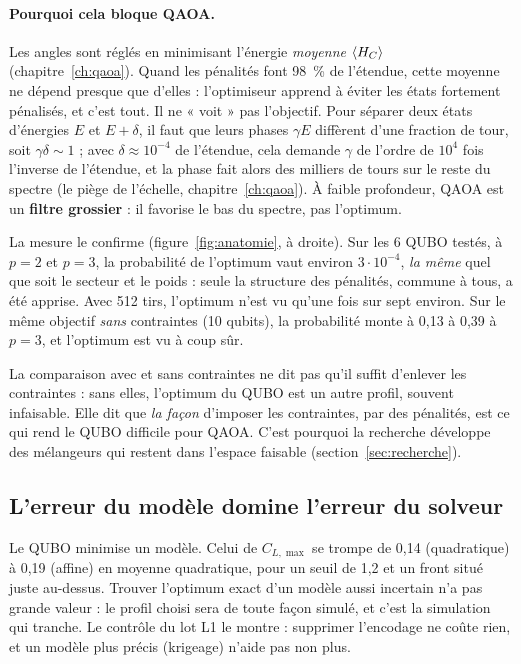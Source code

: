 \paragraph{Pourquoi cela bloque QAOA.} Les angles sont réglés en minimisant l'énergie \emph{moyenne} $\langle H_C\rangle$ (chapitre~\ref{ch:qaoa}). Quand les pénalités font 98~\% de l'étendue, cette moyenne ne dépend presque que d'elles : l'optimiseur apprend à éviter les états fortement pénalisés, et c'est tout. Il ne « voit » pas l'objectif. Pour séparer deux états d'énergies $E$ et $E+\delta$, il faut que leurs phases $\gamma E$ diffèrent d'une fraction de tour, soit $\gamma\delta\sim1$ ; avec $\delta\approx10^{-4}$ de l'étendue, cela demande $\gamma$ de l'ordre de $10^4$ fois l'inverse de l'étendue, et la phase fait alors des milliers de tours sur le reste du spectre (le piège de l'échelle, chapitre~\ref{ch:qaoa}). À faible profondeur, QAOA est un \textbf{filtre grossier} : il favorise le bas du spectre, pas l'optimum.

La mesure le confirme (figure~\ref{fig:anatomie}, à droite). Sur les 6 QUBO testés, à $p=2$ et $p=3$, la probabilité de l'optimum vaut environ $3\cdot10^{-4}$, \emph{la même} quel que soit le secteur et le poids : seule la structure des pénalités, commune à tous, a été apprise. Avec 512 tirs, l'optimum n'est vu qu'une fois sur sept environ. Sur le même objectif \emph{sans} contraintes (10 qubits), la probabilité monte à 0,13 à 0,39 à $p=3$, et l'optimum est vu à coup sûr.

\begin{piege}
La comparaison avec et sans contraintes ne dit pas qu'il suffit d'enlever les contraintes : sans elles, l'optimum du QUBO est un autre profil, souvent infaisable. Elle dit que \emph{la façon} d'imposer les contraintes, par des pénalités, est ce qui rend le QUBO difficile pour QAOA. C'est pourquoi la recherche développe des mélangeurs qui restent dans l'espace faisable (section~\ref{sec:recherche}).
\end{piege}

\subsection{L'erreur du modèle domine l'erreur du solveur}
Le QUBO minimise un modèle. Celui de $C_{L,\max}$ se trompe de 0,14 (quadratique) à 0,19 (affine) en moyenne quadratique, pour un seuil de 1,2 et un front situé juste au-dessus. Trouver l'optimum exact d'un modèle aussi incertain n'a pas grande valeur : le profil choisi sera de toute façon simulé, et c'est la simulation qui tranche. Le contrôle du lot L1 le montre : supprimer l'encodage ne coûte rien, et un modèle plus précis (krigeage) n'aide pas non plus.

